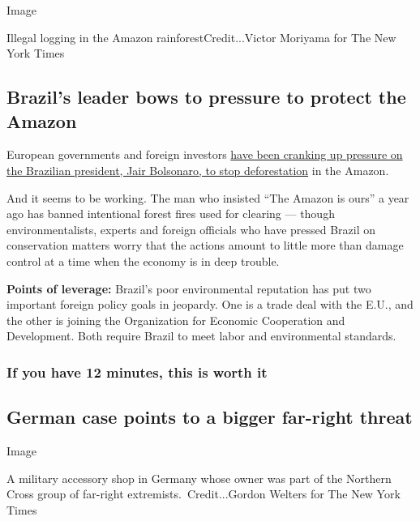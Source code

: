 Image

Illegal logging in the Amazon rainforestCredit...Victor Moriyama for The
New York Times

\hypertarget{brazils-leader-bows-to-pressure-to-protect-the-amazon}{%
\subsection{Brazil's leader bows to pressure to protect the
Amazon}\label{brazils-leader-bows-to-pressure-to-protect-the-amazon}}

European governments and foreign investors
\href{https://www.nytimes.com/2020/08/01/world/americas/Brazil-amazon-deforestation-bolsonaro.html?referringSource=articleShare}{have
been cranking up pressure on the Brazilian president, Jair Bolsonaro, to
stop deforestation} in the Amazon.

And it seems to be working. The man who insisted ``The Amazon is ours''
a year ago has banned intentional forest fires used for clearing ---
though environmentalists, experts and foreign officials who have pressed
Brazil on conservation matters worry that the actions amount to little
more than damage control at a time when the economy is in deep trouble.

\textbf{Points of leverage:} Brazil's poor environmental reputation has
put two important foreign policy goals in jeopardy. One is a trade deal
with the E.U., and the other is joining the Organization for Economic
Cooperation and Development. Both require Brazil to meet labor and
environmental standards.

\hypertarget{if-you-have-12-minutes-this-is-worth-it}{%
\subsubsection{If you have 12 minutes, this is worth
it}\label{if-you-have-12-minutes-this-is-worth-it}}

\hypertarget{german-case-points-to-a-bigger-far-right-threat}{%
\subsection{German case points to a bigger far-right
threat}\label{german-case-points-to-a-bigger-far-right-threat}}

Image

A military accessory shop in Germany whose owner was part of the
Northern Cross group of far-right extremists.~Credit...Gordon Welters
for The New York Times

